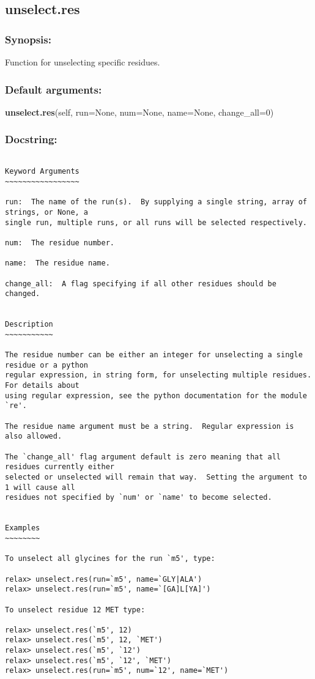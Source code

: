 \newpage

\subsection{unselect.res}


\subsubsection{Synopsis:}

Function for unselecting specific residues.

\subsubsection{Default arguments:}

\textsf{\textbf{unselect.res}(self, run=None, num=None, name=None, change\_all=0)
}


\subsubsection{Docstring:}

{\scriptsize
\begin{verbatim}

Keyword Arguments
~~~~~~~~~~~~~~~~~

run:  The name of the run(s).  By supplying a single string, array of strings, or None, a
single run, multiple runs, or all runs will be selected respectively.

num:  The residue number.

name:  The residue name.

change_all:  A flag specifying if all other residues should be changed.


Description
~~~~~~~~~~~

The residue number can be either an integer for unselecting a single residue or a python
regular expression, in string form, for unselecting multiple residues.  For details about
using regular expression, see the python documentation for the module `re'.

The residue name argument must be a string.  Regular expression is also allowed.

The `change_all' flag argument default is zero meaning that all residues currently either
selected or unselected will remain that way.  Setting the argument to 1 will cause all
residues not specified by `num' or `name' to become selected.


Examples
~~~~~~~~

To unselect all glycines for the run `m5', type:

relax> unselect.res(run=`m5', name=`GLY|ALA')
relax> unselect.res(run=`m5', name=`[GA]L[YA]')

To unselect residue 12 MET type:

relax> unselect.res(`m5', 12)
relax> unselect.res(`m5', 12, `MET')
relax> unselect.res(`m5', `12')
relax> unselect.res(`m5', `12', `MET')
relax> unselect.res(run=`m5', num=`12', name=`MET')
\end{verbatim}
}



